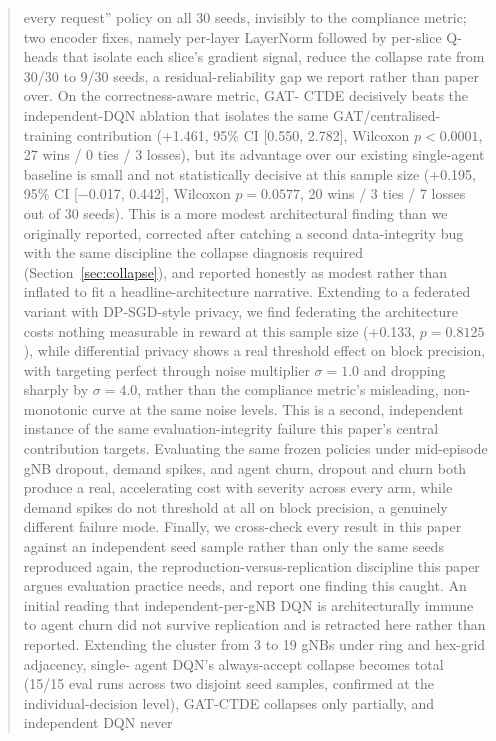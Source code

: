\documentclass[journal]{IEEEtran}
\begin{document}
\begin{abstract}
every request'' policy on all 30 seeds, invisibly to the compliance
metric; two encoder fixes, namely per-layer LayerNorm followed by
per-slice Q-heads that isolate each slice's gradient signal, reduce the
collapse rate from 30/30 to 9/30 seeds, a residual-reliability gap we
report rather than paper over. On the correctness-aware metric, GAT-
CTDE decisively beats the independent-DQN ablation that isolates the
same GAT/centralised-training contribution (+1.461, 95\% CI [0.550,
2.782], Wilcoxon $p<0.0001$, 27 wins / 0 ties / 3 losses), but its
advantage over our existing single-agent baseline is small and not
statistically decisive at this sample size (+0.195, 95\% CI
[$-$0.017, 0.442], Wilcoxon $p=0.0577$, 20 wins / 3 ties / 7 losses out
of 30 seeds). This is a more modest architectural finding than we originally
reported, corrected after catching a second data-integrity bug with
the same discipline the collapse diagnosis required
(Section~\ref{sec:collapse}), and reported honestly as modest rather
than inflated to fit a headline-architecture narrative. Extending to a
federated variant with DP-SGD-style privacy, we find federating the
architecture costs nothing measurable in reward at this sample size
(+0.133, $p=0.8125$), while differential privacy shows a real
threshold effect on block precision, with targeting perfect through noise
multiplier $\sigma=1.0$ and dropping sharply by $\sigma=4.0$, rather
than the compliance metric's misleading, non-monotonic curve at the
same noise levels. This is a second, independent instance of the same
evaluation-integrity failure this paper's central contribution
targets. Evaluating the same frozen policies under mid-episode gNB
dropout, demand spikes, and agent churn, dropout and churn both
produce a real, accelerating cost with severity across every arm,
while demand spikes do not threshold at all on block precision, a
genuinely different failure mode. Finally, we cross-check every result
in this paper against an independent seed sample rather than only the same
seeds reproduced again, the reproduction-versus-replication
discipline this paper argues evaluation practice needs, and report
one finding this caught. An initial reading that independent-per-gNB
DQN is architecturally immune to agent churn did not survive
replication and is retracted here rather than reported. Extending the
cluster from 3 to 19 gNBs under ring and hex-grid adjacency, single-
agent DQN's always-accept collapse becomes total (15/15 eval runs
across two disjoint seed samples, confirmed at the individual-decision
level), GAT-CTDE collapses only partially, and independent DQN never

\end{abstract}
\end{document}
